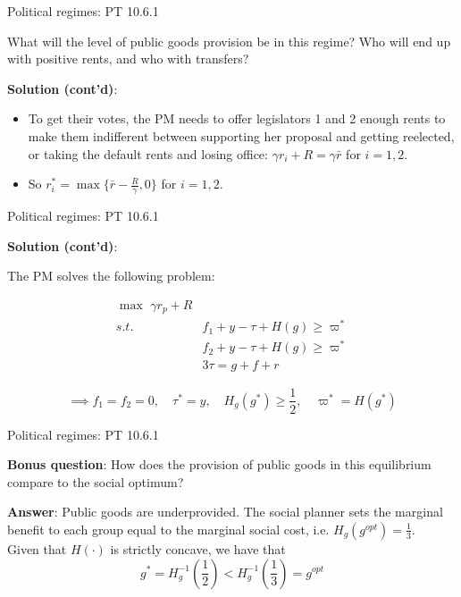 \documentclass[11pt,aspectratio=169]{beamer}
\begin{document}
\begin{frame}{Political regimes: PT 10.6.1}

\begin{tcolorbox}
What will the level of public goods provision be in this regime?
Who will end up with positive rents, and who with transfers?
\end{tcolorbox}

\textbf{Solution (cont'd)}:

\begin{itemize}
\item To get their votes, the PM needs to offer legislators 1 and 2 enough rents to make them indifferent between supporting her proposal and getting reelected, or taking the default rents and losing office: $\gamma r_{i}+R = \gamma \bar{r}$ for $i=1,2$. 
\item So $r_i^* = \operatorname{max} \{ \bar{r} - \frac{R}{\gamma}, 0 \} $ for $i = 1, 2$.
\end{itemize}

\end{frame}

\begin{frame}{Political regimes: PT 10.6.1}


\textbf{Solution (cont'd)}:

The PM solves the following problem:

\begin{align*}
\operatorname{max \, \,} \gamma r_p + R & \\
s.t. \, \, \, & f_1 + y - \tau + H(g) \geq \varpi^* \\
 & f_2 + y - \tau + H(g) \geq \varpi^* \\
 & 3\tau = g + f + r
\end{align*}

\pause


$$ \implies f_1 = f_2 = 0, \, \, \, \, \, \,  \tau^* = y, \, \, \, \, \, \, H_g(g^*) \geq \frac{1}{2}, \, \, \, \, \, \, \varpi^* = H(g^*)$$



\end{frame}


\begin{frame}{Political regimes: PT 10.6.1}

\begin{tcolorbox}
\textbf{Bonus question}: How does the provision of public goods in this equilibrium compare to the social optimum?
\end{tcolorbox}

\pause

\textbf{Answer}: Public goods are \alert{underprovided}. The social planner sets the marginal benefit to each group equal to the marginal social cost, i.e. $H_g(g^{opt}) = \frac{1}{3}$. \\

\vspace{1em}
Given that $H(\cdot)$ is strictly concave, we have that $$ g^* = H_g^{-1} \left( \frac{1}{2} \right) < H_g^{-1} \left( \frac{1}{3} \right) = g^{opt} $$

\end{frame}
\end{document}
